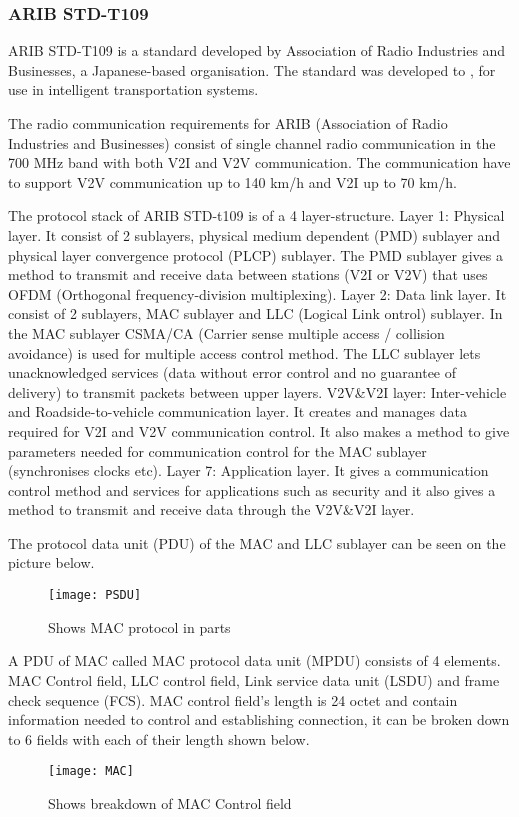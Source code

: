 \subsubsection{ARIB STD-T109}
% 
ARIB STD-T109 is a standard developed by Association of Radio Industries and Businesses, a Japanese-based organisation. The standard was developed to , for use in intelligent transportation systems.\par
% 
The radio communication requirements for ARIB (Association of Radio Industries and Businesses) consist of single channel radio communication in the 700 MHz band with both V2I and V2V communication. The communication have to support V2V communication up to 140 km/h and V2I up to 70 km/h.\par
% 
The protocol stack of ARIB STD-t109 is of a 4 layer-structure.
Layer 1: Physical layer. It consist of 2 sublayers, physical medium dependent (PMD) sublayer and physical layer convergence protocol (PLCP) sublayer. The PMD sublayer gives a method to transmit and receive data between stations (V2I or V2V) that uses OFDM (Orthogonal frequency-division multiplexing).
Layer 2: Data link layer. It consist of 2 sublayers, MAC sublayer and LLC (Logical Link ontrol) sublayer. In the MAC sublayer CSMA/CA (Carrier sense multiple access / collision avoidance) is used for multiple access control method. The LLC sublayer lets unacknowledged services (data without error control and no guarantee of delivery) to transmit packets between upper layers.
V2V\&V2I layer: Inter-vehicle and Roadside-to-vehicle communication layer. It creates and manages data required for V2I and V2V communication control. It also makes a method to give parameters needed for communication control for the MAC sublayer (synchronises clocks etc).
Layer 7: Application layer. It gives a communication control method and services for applications such as security and it also gives a method to transmit and receive data through the V2V\&V2I layer. 
\par
The protocol data unit (PDU) of the MAC and LLC sublayer can be seen on the picture below.
\begin{figure}
    \centering
    \texttt{[image: PSDU]}
    \caption{Shows MAC protocol in parts}
    \label{fig:PSDU}
\end{figure}

A PDU of MAC called MAC protocol data unit (MPDU) consists of 4 elements. MAC Control field, LLC control field, Link service data unit (LSDU) and frame check sequence (FCS).
MAC control field's length is 24 octet and contain information needed to control and establishing connection, it can be broken down to 6 fields with each of their length shown below.
\begin{figure}
    \centering
    \texttt{[image: MAC]}
    \caption{Shows breakdown of MAC Control field}
    \label{fig:MAC}
\end{figure}


